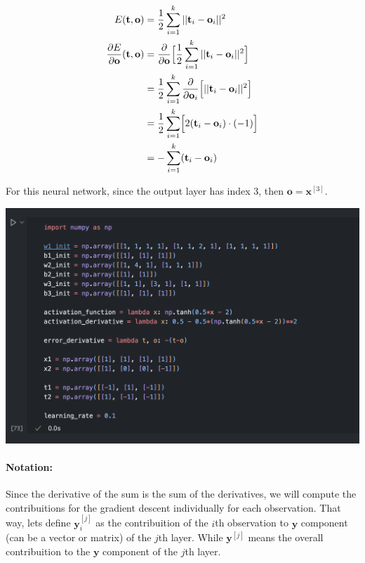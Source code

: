 \documentclass[12pt]{article}
\begin{document}
\begin{enumerate}[leftmargin=\labelsep]
    \begin{equation}
    \begin{split}
        E(\mathbf{t}, \mathbf{o}) &= \frac{1}{2}\sum_{i=1}^{k}||\mathbf{t}_i-\mathbf{o}_i||^2 \\
        \frac{\partial E}{\partial \mathbf{o}}(\mathbf{t}, \mathbf{o}) &= \frac{\partial}{\partial \mathbf{o}}\Bigl[\frac{1}{2}\sum_{i=1}^{k}||\mathbf{t}_i-\mathbf{o}_i||^2 \Bigr] \\
        &= \frac{1}{2}\sum_{i=1}^{k}\frac{\partial}{\partial \mathbf{o}_i}\Bigl[||\mathbf{t}_i-\mathbf{o}_i||^2 \Bigr] \\
        &= \frac{1}{2}\sum_{i=1}^{k}\Bigl[ 2(\mathbf{t}_i - \mathbf{o}_i)\cdot(-1)\Bigr] \\
        &= -\sum_{i=1}^{k}(\mathbf{t}_i - \mathbf{o}_i)
    \end{split}
    \end{equation}

    For this neural network, since the output layer has index 3, then $\mathbf{o} = \mathbf{x}^{[3]}$.

    \begin{center}
        \includegraphics[scale=0.5]{images/code2.png}
    \end{center}

    \paragraph{Notation:} Since the derivative of the sum is the sum of the derivatives, we will compute the contribuitions for the gradient descent individually for each observation. That way, lets define $\mathbf{y}_i^{[j]}$ as the contribuition of the $i$th observation to $\mathbf{y}$ component (can be a vector or matrix) of the $j$th layer. While $\mathbf{y}^{[j]}$ means the overall contribuition to the $\mathbf{y}$ component of the $j$th layer.


\end{enumerate}
\end{document}
